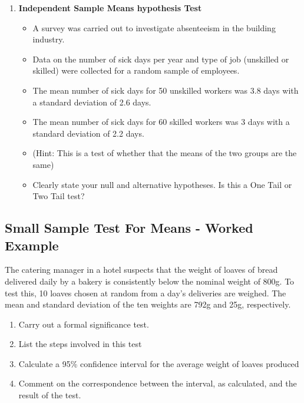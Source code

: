 \documentclass[]{report}
\begin{document}
\begin{enumerate}
\begin{itemize}
	\end{itemize}
	
	\item \textbf{Independent Sample Means hypothesis Test }
	
	\begin{itemize}
		\item 	A survey was carried out to investigate absenteeism in the building industry.
		\item Data on the number of sick days per year and type of job (unskilled or skilled)
		were collected for a random sample of employees.
		\item The mean number of sick days for 50 unskilled workers was 3.8 days with a standard deviation of 2.6 days. 
		\item The mean number of sick days for 60 skilled workers was 3 days with a standard deviation of 2.2 days. 
		\item (Hint: This is a test of whether that the means of the two groups are the same)
		
		\item Clearly state your null and alternative hypotheses.
		Is this a One Tail or Two Tail test?
	\end{itemize}
	
\end{enumerate}		








\subsection{Small Sample Test For Means - Worked Example}
The catering manager in a hotel suspects that the weight of loaves of bread delivered
daily by a bakery is consistently below the nominal weight of 800g. To test this,
10 loaves chosen at random from a day’s deliveries are weighed. The mean and
standard deviation of the ten weights are 792g and 25g, respectively.

\begin{enumerate}
	\item  Carry out a formal significance test.
	\item List the steps involved in this test 
	\item Calculate a 95\% confidence interval for the average weight of loaves produced
	\item Comment on the correspondence between the interval, as calculated, and the
	result of the test.
\end{enumerate}	
\end{document}
